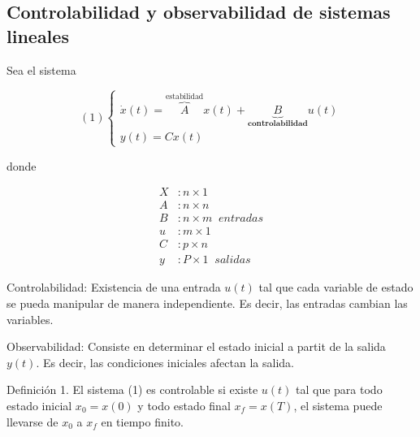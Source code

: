 \subsection{Controlabilidad y observabilidad de sistemas lineales}

Sea el sistema 

\[
    (1)
    \left\{
        \begin{array}{lll}
            \dot{x}(t) = \overbrace{A}^{\text{estabilidad}}x(t) + \underbrace{B}_{\textbf{controlabilidad}}u(t)\\
            y(t) = Cx(t)
        \end{array}
    \right.
\]

donde 

\[
    \begin{split}
        X & : n\times 1\\
        A & : n\times n\\
        B & : n\times m \;\; entradas\\
        u & : m\times 1\\
        C & : p\times n\\
        y & : P\times 1 \;\;salidas
    \end{split}
\]

Controlabilidad: Existencia de una entrada \(u(t)\) tal que cada variable de estado se pueda manipular de manera independiente. Es decir, las entradas cambian las variables.

Observabilidad: Consiste en determinar el estado inicial a partit de la salida \(y(t)\). Es decir, las condiciones iniciales afectan la salida.

Definición 1. El sistema (1) es controlable si existe \(u(t)\) tal que para todo estado inicial \(x_{0}=x(0)\) y todo estado final \(x_{f}=x(T)\), el sistema puede llevarse de \(x_{0}\) a \(x_{f}\) en tiempo finito.